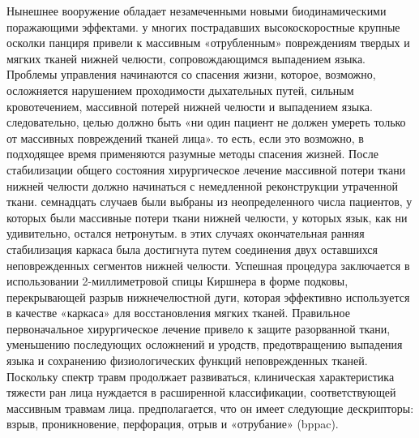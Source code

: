 Нынешнее вооружение обладает незамеченными новыми биодинамическими поражающими
эффектами. у многих пострадавших высокоскоростные крупные осколки панциря
привели к массивным «отрубленным» повреждениям твердых и мягких тканей нижней
челюсти, сопровождающимся выпадением языка. Проблемы управления начинаются со
спасения жизни, которое, возможно, осложняется нарушением проходимости
дыхательных путей, сильным кровотечением, массивной потерей нижней челюсти и
выпадением языка. следовательно, целью должно быть «ни один пациент не должен
умереть только от массивных повреждений тканей лица». то есть, если это
возможно, в подходящее время применяются разумные методы спасения жизней. После
стабилизации общего состояния хирургическое лечение массивной потери ткани
нижней челюсти должно начинаться с немедленной реконструкции утраченной ткани.
семнадцать случаев были выбраны из неопределенного числа пациентов, у которых
были массивные потери ткани нижней челюсти, у которых язык, как ни удивительно,
остался нетронутым. в этих случаях окончательная ранняя стабилизация каркаса
была достигнута путем соединения двух оставшихся неповрежденных сегментов нижней
челюсти. Успешная процедура заключается в использовании 2-миллиметровой спицы
Киршнера в форме подковы, перекрывающей разрыв нижнечелюстной дуги, которая
эффективно используется в качестве «каркаса» для восстановления мягких тканей.
Правильное первоначальное хирургическое лечение привело к защите разорванной
ткани, уменьшению последующих осложнений и уродств, предотвращению выпадения
языка и сохранению физиологических функций неповрежденных тканей. Поскольку
спектр травм продолжает развиваться, клиническая характеристика тяжести ран лица
нуждается в расширенной классификации, соответствующей массивным травмам лица.
предполагается, что он имеет следующие дескрипторы: взрыв, проникновение,
перфорация, отрыв и «отрубание» (bppac).\cite{shuker2013}

